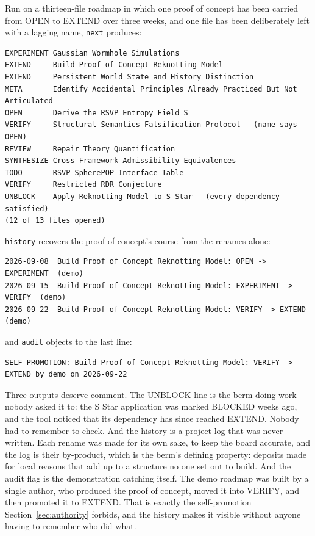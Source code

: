 \documentclass[11pt]{article}
\newcommand{\st}[1]{\textsf{#1}}
\begin{document}
Run on a thirteen-file roadmap in which one proof of concept has been carried from \st{OPEN} to \st{EXTEND} over three weeks, and one file has been deliberately left with a lagging name, \texttt{next} produces:
\begin{lstlisting}
EXPERIMENT Gaussian Wormhole Simulations
EXTEND     Build Proof of Concept Reknotting Model
EXTEND     Persistent World State and History Distinction
META       Identify Accidental Principles Already Practiced But Not Articulated
OPEN       Derive the RSVP Entropy Field S
VERIFY     Structural Semantics Falsification Protocol   (name says OPEN)
REVIEW     Repair Theory Quantification
SYNTHESIZE Cross Framework Admissibility Equivalences
TODO       RSVP SpherePOP Interface Table
VERIFY     Restricted RDR Conjecture
UNBLOCK    Apply Reknotting Model to S Star   (every dependency satisfied)
(12 of 13 files opened)
\end{lstlisting}
\texttt{history} recovers the proof of concept's course from the renames alone:
\begin{lstlisting}
2026-09-08  Build Proof of Concept Reknotting Model: OPEN -> EXPERIMENT  (demo)
2026-09-15  Build Proof of Concept Reknotting Model: EXPERIMENT -> VERIFY  (demo)
2026-09-22  Build Proof of Concept Reknotting Model: VERIFY -> EXTEND  (demo)
\end{lstlisting}
and \texttt{audit} objects to the last line:
\begin{lstlisting}
SELF-PROMOTION: Build Proof of Concept Reknotting Model: VERIFY -> EXTEND by demo on 2026-09-22
\end{lstlisting}

Three outputs deserve comment. The \st{UNBLOCK} line is the berm doing work nobody asked it to: the S Star application was marked \st{BLOCKED} weeks ago, and the tool noticed that its dependency has since reached \st{EXTEND}. Nobody had to remember to check. And the history is a project log that was never written. Each rename was made for its own sake, to keep the board accurate, and the log is their by-product, which is the berm's defining property: deposits made for local reasons that add up to a structure no one set out to build. And the audit flag is the demonstration catching itself. The demo roadmap was built by a single author, who produced the proof of concept, moved it into \st{VERIFY}, and then promoted it to \st{EXTEND}. That is exactly the self-promotion Section~\ref{sec:authority} forbids, and the history makes it visible without anyone having to remember who did what.
\end{document}
